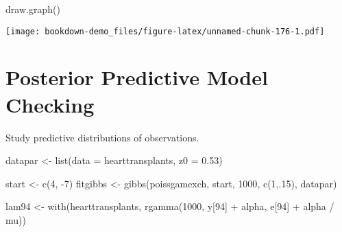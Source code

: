 \documentclass[
]{book}
\newenvironment{Shaded}{\begin{snugshade}}{\end{snugshade}}
\newcommand{\AttributeTok}[1]{\textcolor[rgb]{0.77,0.63,0.00}{#1}}
\newcommand{\DecValTok}[1]{\textcolor[rgb]{0.00,0.00,0.81}{#1}}
\newcommand{\FloatTok}[1]{\textcolor[rgb]{0.00,0.00,0.81}{#1}}
\newcommand{\FunctionTok}[1]{\textcolor[rgb]{0.00,0.00,0.00}{#1}}
\newcommand{\NormalTok}[1]{#1}
\newcommand{\OtherTok}[1]{\textcolor[rgb]{0.56,0.35,0.01}{#1}}
\newcommand{\SpecialCharTok}[1]{\textcolor[rgb]{0.00,0.00,0.00}{#1}}
\begin{document}
\begin{Shaded}
\begin{Highlighting}[]
\FunctionTok{draw.graph}\NormalTok{()}
\end{Highlighting}
\end{Shaded}

\texttt{[image: bookdown-demo\_files/figure-latex/unnamed-chunk-176-1.pdf]}

\hypertarget{posterior-predictive-model-checking}{%
\section{Posterior Predictive Model Checking}\label{posterior-predictive-model-checking}}

Study predictive distributions of observations.

\begin{Shaded}
\begin{Highlighting}[]
\NormalTok{datapar }\OtherTok{\textless{}{-}} \FunctionTok{list}\NormalTok{(}\AttributeTok{data =}\NormalTok{ hearttransplants, }\AttributeTok{z0 =} \FloatTok{0.53}\NormalTok{)}
\end{Highlighting}
\end{Shaded}

\begin{Shaded}
\begin{Highlighting}[]
\NormalTok{start }\OtherTok{\textless{}{-}} \FunctionTok{c}\NormalTok{(}\DecValTok{4}\NormalTok{, }\SpecialCharTok{{-}}\DecValTok{7}\NormalTok{)}
\NormalTok{fitgibbs }\OtherTok{\textless{}{-}} \FunctionTok{gibbs}\NormalTok{(poissgamexch, }
\NormalTok{                  start, }\DecValTok{1000}\NormalTok{, }\FunctionTok{c}\NormalTok{(}\DecValTok{1}\NormalTok{,.}\DecValTok{15}\NormalTok{), }
\NormalTok{                  datapar)}
\end{Highlighting}
\end{Shaded}

\begin{Shaded}
\begin{Highlighting}[]
\NormalTok{lam94 }\OtherTok{\textless{}{-}} \FunctionTok{with}\NormalTok{(hearttransplants,}
      \FunctionTok{rgamma}\NormalTok{(}\DecValTok{1000}\NormalTok{, y[}\DecValTok{94}\NormalTok{] }\SpecialCharTok{+}\NormalTok{ alpha, }
\NormalTok{             e[}\DecValTok{94}\NormalTok{] }\SpecialCharTok{+}\NormalTok{ alpha }\SpecialCharTok{/}\NormalTok{ mu))}
\end{Highlighting}
\end{Shaded}
\end{document}

